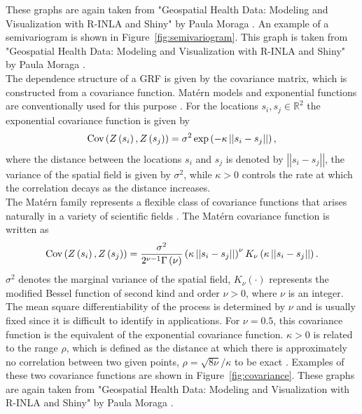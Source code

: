 These graphs are again taken from "Geospatial Health Data: Modeling and Visualization with R-INLA and Shiny" by Paula Moraga \autocite[][]{moraga2019geospatial}. 
An example of a semivariogram is shown in Figure~\ref{fig:semivariogram}. This graph is taken from "Geospatial Health Data: Modeling and Visualization with R-INLA and Shiny" by Paula Moraga \autocite[][]{moraga2019geospatial}. \\ 
The dependence structure of a GRF is given by the covariance matrix, which is constructed from a covariance function. Matérn models and exponential functions are conventionally used for this purpose \autocite[][]{gelfand2010handbook}. For the locations $s_i, s_j\in\mathbb{R}^2$ the exponential covariance function is given by
\begin{equation}
\hbox{Cov}\left(Z\left(s_i\right), Z\left(s_j\right)\right)=\sigma^2\exp\left(-\kappa\left|\left|s_i-s_j\right|\right|\right),
\end{equation}
where the distance between the locations $s_i$ and $s_j$ is denoted by $\left|\left|s_i-s_j\right|\right|$, the variance of the spatial field is given by $\sigma^2$, while $\kappa>0$ controls the rate at which the correlation decays as the distance increases. \\
The Matérn family represents a flexible class of covariance functions that arises naturally in a variety of scientific fields \autocite[][]{guttorp2006studies}. The Matérn covariance function is written as
\begin{equation}
    \hbox{Cov}\left(Z\left(s_i\right),Z\left(s_j\right)\right)=\frac{\sigma^2}{2^{\nu-1}\Gamma\left(\nu\right)}\left(\kappa\left|\left|s_i-s_j\right|\right|\right)^{\nu}K_\nu\left(\kappa\left|\left|s_i-s_j\right|\right|\right).
\end{equation}
$\sigma^2$ denotes the marginal variance of the spatial field, $K_\nu\left(\cdot\right)$ represents the modified Bessel function of second kind and order $\nu>0$, where $\nu$ is an integer. The mean square differentiability of the process is determined by $\nu$ and is usually fixed since it is difficult to identify in applications. For $\nu=0.5$, this covariance function is the equivalent of the exponential covariance function. $\kappa > 0$ is related to the range $\rho$, which is defined as the distance at which there is approximately no correlation between two given points, $\rho=\sqrt{8\nu}/\kappa$ to be exact \autocite[][]{cameletti2013spatio}. Examples of these two covariance functions are shown in Figure~\ref{fig:covariance}. These graphs are again taken from "Geospatial Health Data: Modeling and Visualization with R-INLA and Shiny" by Paula Moraga \autocite[][]{moraga2019geospatial}. 
